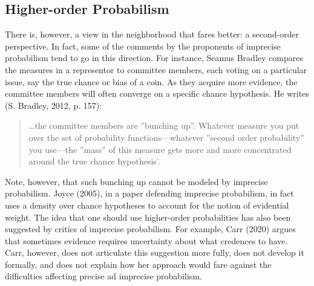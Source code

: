 \documentclass[
  10pt,
  dvipsnames,enabledeprecatedfontcommands]{scrartcl}
\begin{document}
\hypertarget{higher-order-probabilism}{%
\subsection{Higher-order Probabilism}\label{higher-order-probabilism}}

There is, however, a view in the neighborhood that fares better: a
second-order perspective. In fact, some of the comments by the
proponents of imprecise probabilism tend to go in this direction. For
instance, Seamus Bradley compares the measures in a representor to
committee members, each voting on a particular issue, say the true
chance or bias of a coin. As they acquire more evidence, the committee
members will often converge on a specific chance hypothesis. He writes
(S. Bradley, 2012, p. 157):

\begin{quote}
\dots the committee members are ''bunching up''. Whatever measure you put over the set of probability functions---whatever ''second order probability'' you use---the ''mass'' of this measure gets more and more concentrated around the true chance hypothesis'.
\end{quote}

\noindent Note, however, that such bunching up cannot be modeled by
imprecise probabilism. Joyce (2005), in a paper defending imprecise
probabilism, in fact uses a density over chance hypotheses to account
for the notion of evidential weight. The idea that one should use
higher-order probabilities has also been suggested by critics of
imprecise probabilism. For example, Carr (2020) argues that sometimes
evidence requires uncertainty about what credences to have. Carr,
however, does not articulate this suggestion more fully, does not
develop it formally, and does not explain how her approach would fare
against the difficulties affecting precise ad imprecise probabilism.
\end{document}
